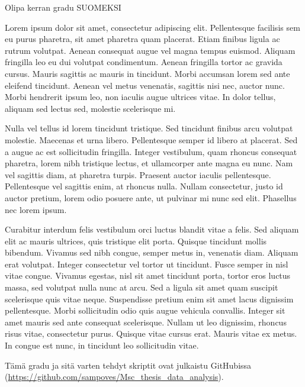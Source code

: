 \justify
Olipa kerran gradu SUOMEKSI

Lorem ipsum dolor sit amet, consectetur adipiscing elit. Pellentesque facilisis sem eu purus pharetra, sit amet pharetra quam placerat. Etiam finibus ligula ac rutrum volutpat. Aenean consequat augue vel magna tempus euismod. Aliquam fringilla leo eu dui volutpat condimentum. Aenean fringilla tortor ac gravida cursus. Mauris sagittis ac mauris in tincidunt. Morbi accumsan lorem sed ante eleifend tincidunt. Aenean vel metus venenatis, sagittis nisi nec, auctor nunc. Morbi hendrerit ipsum leo, non iaculis augue ultrices vitae. In dolor tellus, aliquam sed lectus sed, molestie scelerisque mi.

Nulla vel tellus id lorem tincidunt tristique. Sed tincidunt finibus arcu volutpat molestie. Maecenas et urna libero. Pellentesque semper id libero at placerat. Sed a augue ac est sollicitudin fringilla. Integer vestibulum, quam rhoncus consequat pharetra, lorem nibh tristique lectus, et ullamcorper ante magna eu nunc. Nam vel sagittis diam, at pharetra turpis. Praesent auctor iaculis pellentesque. Pellentesque vel sagittis enim, at rhoncus nulla. Nullam consectetur, justo id auctor pretium, lorem odio posuere ante, ut pulvinar mi nunc sed elit. Phasellus nec lorem ipsum.

Curabitur interdum felis vestibulum orci luctus blandit vitae a felis. Sed aliquam elit ac mauris ultrices, quis tristique elit porta. Quisque tincidunt mollis bibendum. Vivamus sed nibh congue, semper metus in, venenatis diam. Aliquam erat volutpat. Integer consectetur vel tortor ut tincidunt. Fusce semper in nisl vitae congue. Vivamus egestas, nisl sit amet tincidunt porta, tortor eros luctus massa, sed volutpat nulla nunc at arcu. Sed a ligula sit amet quam suscipit scelerisque quis vitae neque. Suspendisse pretium enim sit amet lacus dignissim pellentesque. Morbi sollicitudin odio quis augue vehicula convallis. Integer sit amet mauris sed ante consequat scelerisque. Nullam ut leo dignissim, rhoncus risus vitae, consectetur purus. Quisque vitae cursus erat. Mauris vitae ex metus. In congue est nunc, in tincidunt leo sollicitudin vitae.

Tämä gradu ja sitä varten tehdyt skriptit ovat julkaistu GitHubissa (\textcolor{blue}{\url{https://github.com/sampoves/Msc_thesis_data_analysis}}).